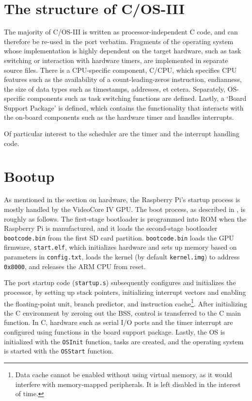 \documentclass[twoside]{uva-inf-bachelor-thesis}
\newcommand{\code}[1]{\lstinline[breaklines=true]{#1}}
\newcommand{\ucosiii}{\textmu C/OS-III\xspace}
\newcommand{\ucpu}{\textmu C/CPU\xspace}
\begin{document}
\section{The structure of \ucosiii}
The majority of \ucosiii is written as processor-independent C code, and can therefore be re-used in the port verbatim. Fragments of the operating system whose implementation is highly dependent on the target hardware, such as task switching or interaction with hardware timers, are implemented in separate source files. There is a CPU-specific component, \ucpu, which specifies CPU features such as the availability of a count-leading-zeros instruction, endianness, the size of data types such as timestamps, addresses, et cetera. Separately, OS-specific components such as task switching functions are defined. Lastly, a `Board Support Package' is defined, which contains the functionality that interacts with the on-board components such as the hardware timer and handles interrupts.

Of particular interest to the scheduler are the timer and the interrupt handling code.

\section{Bootup}
As mentioned in the section on hardware, the Raspberry Pi's startup process is mostly handled by the VideoCore IV GPU. The boot process, as described in \textcite{rpi:bootforum}, is roughly as follows. The first-stage bootloader is programmed into ROM when the Raspberry Pi is manufactured, and it loads the second-stage bootloader \code{bootcode.bin} from the first SD card partition. \code{bootcode.bin} loads the GPU firmware, \code{start.elf}, which initializes hardware and sets up memory based on parameters in \code{config.txt}, loads the kernel (by default \code{kernel.img}) to address \code{0x8000}, and releases the ARM CPU from reset.


The port startup code (\code{startup.s}) subsequently configures and initializes the processor, by setting up stack pointers, initializing interrupt vectors and enabling the floating-point unit, branch predictor, and instruction cache\footnote{Data cache cannot be enabled without using virtual memory, as it would interfere with memory-mapped peripherals. It is left disabled in the interest of time.}. After initializing the C environment by zeroing out the BSS, control is transferred to the C main function. In C, hardware such as serial I/O ports and the timer interrupt are configured using functions in the board support package. Lastly, the OS is initialized with the \code{OSInit} function, tasks are created, and the operating system is started with the \code{OSStart} function.
\end{document}
